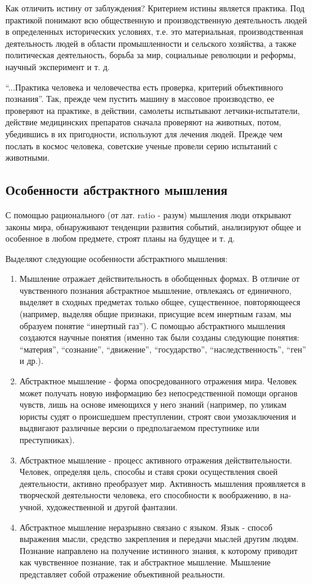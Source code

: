 \documentclass[12pt]{article}
\begin{document}
Как отличить истину от заблуждения? Критерием истины яв­ляется практика.
Под практикой понимают всю общественную и производственную деятельность людей в определенных истори­ческих условиях, т.е. это материальная, производственная дея­тельность людей в области промышленности и сельского хозяй­ства, а также политическая деятельность, борьба за мир, соци­альные революции и реформы, научный эксперимент и т. д.

“...Практика человека и человечества есть проверка, крите­рий объективного познания”.
Так, прежде чем пустить машину в массовое производство, ее проверяют на практике, в дейст­вии, самолеты испытывают летчики-испытатели, действие ме­дицинских препаратов сначала проверяют на животных, потом, убедившись в их пригодности, используют для лечения людей.
Прежде чем послать в космос человека, советские ученые про­вели серию испытаний с животными.

\subsection*{Особенности абстрактного мышления}
С помощью рационального (от лат. ratio - разум) мышления люди открывают законы мира, обнаруживают тенденции развития событий, анализируют общее и особенное в любом предмете, строят планы на будущее и т. д.

Выделяют следующие особенности абстрактного мышления:
\begin{enumerate}
\item Мышление отражает действительность в обобщен­ных формах.
	В отличие от чувственного познания абстрактное мышление, отвлекаясь от единичного, выделяет в сходных пред­метах только общее, существенное, повторяющееся (например, выделяя общие признаки, присущие всем инертным газам, мы образуем понятие “инертный газ”).
	С помощью абстрактного мышления создаются научные понятия (именно так были соз­даны следующие понятия: “материя”, “сознание”, “движение”, “государство”, “наследственность”, “ген” и др.).
\item Абстрактное мышление - форма опосредованного отражения мира.
	Человек может получать новую информа­цию без непосредственной помощи органов чувств, лишь на ос­нове имеющихся у него знаний (например, по уликам юристы судят о происшедшем преступлении, строят свои умозаключе­ния и выдвигают различные версии о предполагаемом преступ­нике или преступниках).
\item Абстрактное мышление - процесс активного отраже­ния действительности.
	Человек, определяя цель, способы и ставя сроки осуществления своей деятельности, активно преобразует мир.
	Активность мышления проявляется в творческой деятельности человека, его способности к воображению, в на­учной, художественной и другой фантазии.
\item Абстрактное мышление неразрывно связано с языком.
	Язык - способ выражения мысли, средство закрепления и пере­дачи мыслей другим людям.
	Познание направлено на получение истинного знания, к которому приводит как чувственное позна­ние, так и абстрактное мышление.
	Мышление представляет со­бой отражение объективной реальности.
\end{enumerate}
\end{document}
